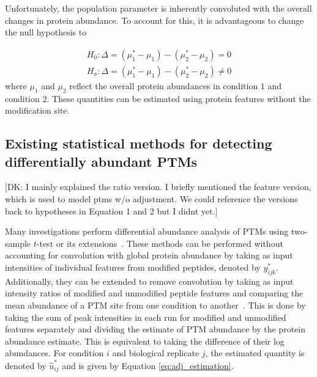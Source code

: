 \documentclass[mcp]{article}
\numberwithin{table}{section}
\def\todo#1{{\color{red}[#1]}}
\begin{document}
Unfortunately, the population parameter is inherently convoluted with the overall changes in protein abundance. To account for this, it is advantageous to change the null hypothesis to

\begin{equation}
\begin{aligned}
H_{0}: \Delta = ( \mu_{1}^{\ast} - \mu_{1}) - ( \mu_{2}^{\ast} - \mu_{2} ) = 0 \\
H_{a}: \Delta = ( \mu_{1}^{\ast} - \mu_{1}) - ( \mu_{2}^{\ast} - \mu_{2} ) \neq 0
\end{aligned}
\label{eq:null_hyp}
\end{equation}
where $\mu_1$ and $\mu_2$ reflect the overall protein abundances in condition $1$ and condition $2$. These quantities can be estimated using protein features without the modification site.


\subsection*{Existing statistical methods for detecting differentially abundant PTMs}

\todo{DK: I mainly explained the ratio version. I briefly mentioned the feature version, which is used to model ptms w/o adjustment. We could reference the versions back to hypotheses in Equation 1 and 2 but I didnt yet.}

Many investigations perform differential abundance analysis of PTMs using two-sample $t$-test or its extensions~\cite{Schwammle2015}. These methods can be performed without accounting for convolution with global protein abundance by taking as input intensities of individual features from modified peptides, denoted by $y_{ijk}^{\ast}$. Additionally, they can be extended to remove convolution by taking as input intensity ratios of modified and unmodified peptide features and comparing the mean abundance of a PTM site from one condition to another~\cite{THOMAS2020}\cite{Mertins:2013}. This is done by taking the sum of peak intensities in each run for modified and unmodified features separately and dividing the estimate of PTM abundance by the protein abundance estimate. This is equivalent to taking the difference of their log abundances. For condition $i$ and biological replicate $j$, the estimated quantity is denoted by $\hat{u}^{\ast}_{ij}$ and is given by Equation \ref{eq:adj_estimation}.
\end{document}
